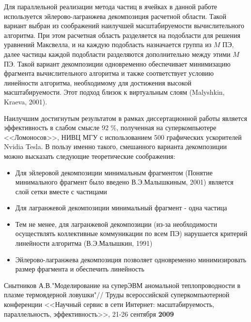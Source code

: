 Для параллельной реализации метода частиц в ячейках в данной работе используется эйлерово-лагранжева декомпозиция расчетной области. Такой вариант выбран из соображений наилучшей масштабируемости вычислительного алгоритма.
При этом расчетная область разделяется на подобласти для решения уравнений Максвелла, и на каждую подобласть назначается группа из $M$ ПЭ, далее частицы каждой подобласти разделяются дополнительно между этими $M$ ПЭ. Такой вариант декомпозиции одновременно обеспечивает минимизацию фрагмента вычислительного алгоритма и также соответствует условию линейности алгоритма, необходимому для достижения высокой масштабируемости. Этот подход близок к виртуальным слоям (Malyshkin, Kraeva, 2001).



Наилучшим достигнутым результатом в рамках диссертационной работы является эффективность в слабом смысле 92 \%, полученная на суперкомпьютере <<Ломоносов>>, НИВЦ МГУ с использованием 500 графических ускорителей Nvidia Tesla. 
В пользу именно такого, смешанного варианта декомпозиции можно высказать следующие теоретические соображения:
\begin{itemize}
	\item Для эйлеровой декомпозиции минимальным фрагментом (Понятие минимального фрагмент было введено В.Э.Малышкиным, 2001) является слой сетки вместе с частицами
	\item Для лагранжевой декомпозиции минимальный фрагмент - одна частица
	\item Тем не менее, для лагранжевой декомпозиции (из-за необходимости осуществлять коллективные коммуникации по всем ПЭ) нарушается критерий линейности алгоритма (В.Э.Малышкин, 1991)
	\item Эйлерово-лагранжева декомпозиция позволяет одновременно минимизировать размер фрагмента и обеспечить линейность
	
\end{itemize}

{\small Снытников А.В."Моделирование на суперЭВМ аномальной  теплопроводности в плазме термоядерной ловушки"// Труды всероссийской суперкомпьютерной конференции <<Научный сервис в сети Интернет: масштабируемость, параллельность, эффективность>>, 21-26 сентября \textbf{2009}}


